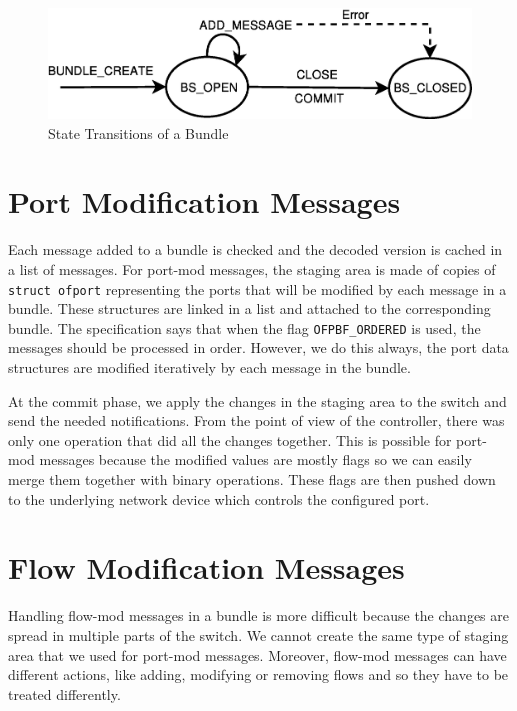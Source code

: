 \begin{figure}[h]
\begin{center}
\includegraphics[scale=0.5]{src/img/bundle-state-machine.eps}
\end{center}
\caption{State Transitions of a Bundle}
\label{fig:bundle-state}
\end{figure}

\section{Port Modification Messages}

Each message added to a bundle is checked and the decoded version is cached in a list of messages.
For port-mod messages, the staging area is made of copies of \texttt{struct ofport} representing the ports that
will be modified by each message in a bundle. These structures are linked in a list and attached to the corresponding bundle.
The specification says that when the flag \texttt{OFPBF_ORDERED} is used, the messages should be processed in order.
However, we do this always, the port data structures are modified iteratively by each message in the bundle.

At the commit phase, we apply the changes in the
staging area to the switch and send the needed notifications. From the point of view of the controller, there was only
one operation that did all the changes together. This is possible for port-mod messages because the modified values are mostly
flags so we can easily merge them together with binary operations. These flags are then pushed down to the underlying
network device which controls the configured port.

\section{Flow Modification Messages}

Handling flow-mod messages in a bundle is more difficult because the changes are spread in multiple parts of the switch.
We cannot create the same type of staging area that we used for port-mod messages. Moreover, flow-mod messages can have
different actions, like adding, modifying or removing flows and so they have to be treated differently.

